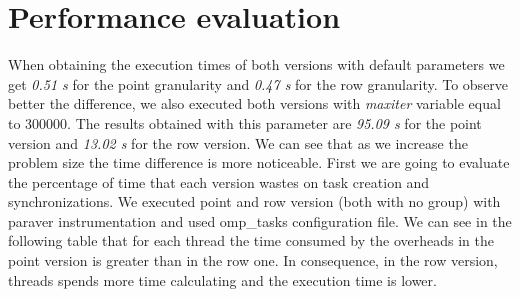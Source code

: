 \documentclass{article}
\begin{document}
\section{Performance evaluation}
\justify
When obtaining the execution times of both versions with default parameters we get \textit{0.51 s} for the point granularity and \textit{0.47 s} for the row granularity.
To observe better the difference, we also executed both versions with \textit{maxiter} variable equal to 300000. The results obtained with this parameter are \textit{95.09 s} for the point version and \textit{13.02 s} for the row version. We can see that as we increase the problem size the time difference is more noticeable.
\justify 
First we are going to evaluate the percentage of time that each version wastes on task creation and synchronizations. We executed point and row version (both with no group) with paraver instrumentation and used omp\_tasks configuration file. We can see in the following table that for each thread the time consumed by the overheads in the point version is greater than in the row one. In consequence, in the row version, threads spends more time calculating and the execution time is lower. 
\end{document}
